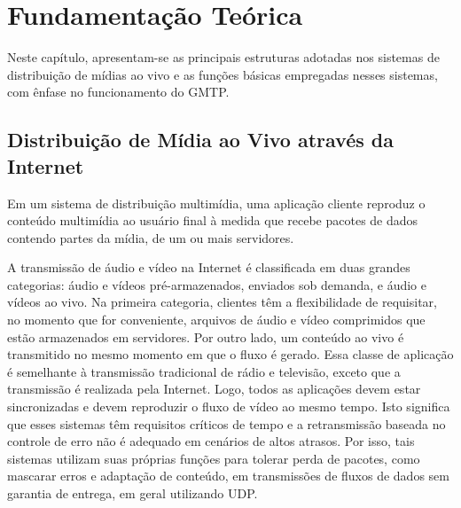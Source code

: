 



% 
% 
% 
% 
\chapter{Fundamentação Teórica}
\label{cap:fundamentacao}

Neste capítulo, apresentam-se as principais estruturas adotadas nos sistemas de distribuição de mídias ao vivo e as funções básicas empregadas nesses sistemas, com ênfase no funcionamento do GMTP.


% 
% 
% 
\section{Distribuição de Mídia ao Vivo através da Internet}
\label{sec:distrib}

Em um sistema de distribuição multimídia, uma aplicação cliente reproduz o conteúdo multimídia ao usuário final à medida que recebe pacotes de dados contendo partes da mídia, de um ou mais servidores.

A transmissão de áudio e vídeo na Internet é classificada em duas grandes categorias: áudio e vídeos pré-armazenados, enviados sob demanda, e áudio e vídeos ao vivo. Na primeira categoria, clientes têm a flexibilidade de requisitar, no momento que for conveniente, arquivos de áudio e vídeo comprimidos que estão armazenados em servidores. Por outro lado, um conteúdo ao vivo é transmitido no mesmo momento em que o fluxo é gerado. 
Essa classe de aplicação é semelhante à transmissão tradicional de rádio e televisão, exceto que a transmissão é realizada pela Internet. 
Logo, todos as aplicações devem estar sincronizadas e devem reproduzir o fluxo de vídeo ao mesmo tempo. 
Isto significa que esses sistemas têm requisitos críticos de tempo e a retransmissão baseada no controle de erro não é adequado em cenários de altos atrasos. Por isso, tais sistemas utilizam suas próprias funções para tolerar perda de pacotes, como mascarar erros e adaptação de conteúdo, em transmissões de fluxos de dados sem garantia de entrega, em geral utilizando UDP.


